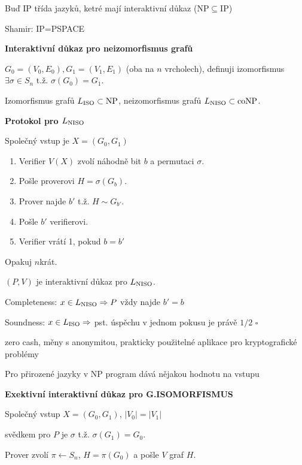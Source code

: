 \documentclass[a4paper,12pt,titlepage]{article}
\def\podnadpis#1{{\bigskip\bf\noindent#1\medskip\par}}
\def\tvrzeni{\medskip\noindent {\bf Tvrzení: }}
\def\dukaz{\noindent {\bf Důkaz: }}
\def\qed{{\hfill{$\square$}}}
\begin{document}
Buď IP třída jazyků, ketré mají interaktivní důkaz (NP$\subseteq$IP)

Shamir: IP=PSPACE

\podnadpis{Interaktivní důkaz pro neizomorfismus grafů}

$G_0=(V_0,E_0), G_1=(V_1,E_1)$ (oba na $n$ vrcholech), definuji izomorfismus $\exists \sigma\in S_n$ t.ž. $\sigma(G_0)=G_1$.

Izomorfismus grafů $L_{\rm ISO}\subset\rm NP$, neizomorfismus grafů $L_{\rm NISO}\subset\rm coNP$.

\podnadpis{Protokol pro $L_{\rm NISO}$}

Společný vstup je $X=(G_0,G_1)$

\begin{enumerate}

\item Verifier $V(X)$ zvolí náhodně bit $b$ a permutaci $\sigma$.

\item Pošle proverovi $H=\sigma(G_b)$.

\item Prover najde $b'$ t.ž. $H\sim G_{b'}$.

\item Pošle $b'$ verifierovi.

\item Verifier vrátí 1, pokud $b=b'$

\end{enumerate}

Opakuj $n$krát.

\tvrzeni $(P,V)$ je interaktivní důkaz pro $L_{\rm NISO}$.

\dukaz Completeness: $x\in L_{\rm NISO} \Rightarrow P$ vždy najde $b'=b$

\noindent Soundness: $x\in L_{\rm ISO} \Rightarrow$ pst. úspěchu v jednom pokusu je právě $1/2$ \qed


zero cash, měny s anonymitou, prakticky použitelné aplikace pro kryptografické problémy

Pro přirozené jazyky v NP program dává nějakou hodnotu na vstupu%

\podnadpis{Exektivní interaktivní důkaz pro G.ISOMORFISMUS}

Společný vstup $X=(G_0,G_1)$, $|V_0|=|V_1|$

svědkem pro $P$ je $\sigma$ t.ž. $\sigma(G_1)=G_0$.

Prover zvolí $\pi\leftarrow S_n$, $H=\pi(G_0)$ a pošle $V$ graf $H$.
\end{document}
